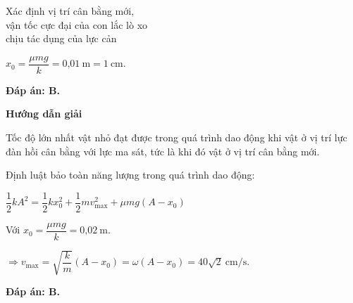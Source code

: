 \begin{dang}{Xác định vị trí cân bằng mới,\\ vận tốc cực đại của con lắc lò xo\\ chịu tác dụng của lực cản}
{		$x_0=\dfrac{\mu mg}{k}=\text{0,01}\ \text{m}=1\ \text{cm}$.
		
		\textbf{Đáp án: B.}
	}
	{\begin{center}
			\textbf{Hướng dẫn giải}
		\end{center}
		
		Tốc độ lớn nhất vật nhỏ đạt được trong quá trình dao động khi vật ở vị trí lực đàn hồi cân bằng với lực ma sát, tức là khi đó vật ở vị trí cân bằng mới.
		
		Định luật bảo toàn năng lượng trong quá trình dao động:
		
		$\dfrac{1}{2}kA^2=\dfrac{1}{2}kx_0^2+\dfrac{1}{2}mv_\text{max}^2+\mu mg(A-x_0)$ 
		
		Với $x_0=\dfrac{\mu mg}{k}=\text{0,02}\ \text{m}$.
		
		$\Rightarrow v_\text{max}=\sqrt{\dfrac{k}{m}}\left(A-x_0\right)=\omega \left(A-x_0\right)=40\sqrt{2}\ \text{cm/s}$.
		
		\textbf{Đáp án: B.}
	}
	
	
\end{dang}

